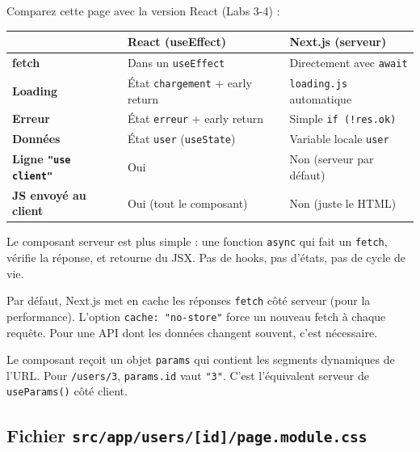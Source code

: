 \documentclass[11pt,a4paper]{article}
\begin{document}
\begin{retenirbox}
Comparez cette page avec la version React (Labs 3-4) :

\begin{center}
\begin{tabular}{lp{4.5cm}p{4.5cm}}
\toprule
& \textbf{React (useEffect)} & \textbf{Next.js (serveur)} \\
\midrule
\textbf{fetch} & Dans un \texttt{useEffect} & Directement avec \texttt{await} \\
\textbf{Loading} & État \texttt{chargement} + early return & \texttt{loading.js} automatique \\
\textbf{Erreur} & État \texttt{erreur} + early return & Simple \texttt{if (!res.ok)} \\
\textbf{Données} & État \texttt{user} (\texttt{useState}) & Variable locale \texttt{user} \\
\textbf{Ligne \texttt{"use client"}} & Oui & Non (serveur par défaut) \\
\textbf{JS envoyé au client} & Oui (tout le composant) & Non (juste le HTML) \\
\bottomrule
\end{tabular}
\end{center}

Le composant serveur est plus simple : une fonction \texttt{async} qui fait un \texttt{fetch}, vérifie la réponse, et retourne du JSX. Pas de hooks, pas d'états, pas de cycle de vie.
\end{retenirbox}

\begin{infobox}
Par défaut, Next.js met en cache les réponses \texttt{fetch} côté serveur (pour la performance). L'option \texttt{cache: "no-store"} force un nouveau fetch à chaque requête. Pour une API dont les données changent souvent, c'est nécessaire.
\end{infobox}

\begin{infobox}
Le composant reçoit un objet \texttt{params} qui contient les segments dynamiques de l'URL. Pour \texttt{/users/3}, \texttt{params.id} vaut \texttt{"3"}. C'est l'équivalent serveur de \texttt{useParams()} côté client.
\end{infobox}

\subsection{Fichier \texttt{src/app/users/[id]/page.module.css}}
\end{document}
